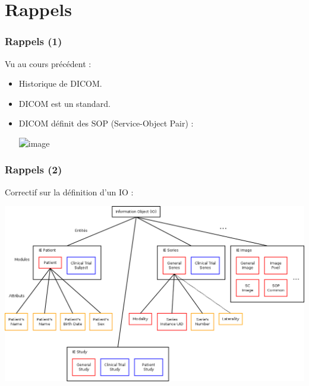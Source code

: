 \section{Rappels}

\frame
{
	\frametitle{Rappels (1)}
	Vu au cours pr\'ec\'edent :
	\begin{itemize}
		\item<1-> Historique de DICOM.
		\item<2-> DICOM est un standard.
		\item<3-> DICOM d\'efinit des SOP (Service-Object Pair) :
		\begin{center}
			\includegraphics<4->[width=\linewidth]{./figures/sop-definition.png}
		\end{center}
	
	\end{itemize}
}

\frame
{
	\frametitle{Rappels (2)}
	Correctif sur la d\'efinition d'un IO :
	\begin{center}
		\includegraphics[width=\linewidth]{./figures/IO-definition.png}
	\end{center}
}


